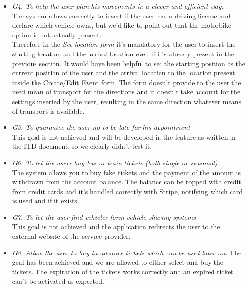 \begin{itemize}
\item \textit{G4. To help the user plan his movements in a clever and efficient way.}\\
The system allows correctly to insert if the user has a driving license and declare which vehicle owns, but we'd like to point out that the motorbike option is not actually present. \\
Therefore in the \textit{See location form} it's mandatory for the user to insert the starting location and the arrival location even if it's already present in the previous section. It would have been helpful to set the starting position as the current position of the user and the arrival location to the location present inside the Create/Edit Event form. The form doesn't provide to the user the used mean of transport for the directions and it doesn't take account for the settings inserted by the user, resulting in the same direction whatever means of transport is available.

\item \textit{G5. To guarantee the user no to be late for his appointment}\\
This goal is not achieved and will be developed in the feature as written in the ITD document, so we clearly didn't test it.

\item \textit{G6. To let the users buy bus or train tickets (both single or seasonal) }\\
The system allows you to buy fake tickets and the payment of the amount is withdrawn from the account balance.
The balance can be topped with credit from credit cards and it's handled correctly with Stripe, notifying which card is used and if it exists.

\item \textit{G7. To let the user find vehicles form vehicle sharing systems}\\
This goal is not achieved and the application redirects the user to the external website of the service provider.

\item \textit{G8. Allow the user to buy in advance tickets which can be used later on.}
The goal has been achieved and we are allowed to either select and buy the tickets. The expiration of the tickets works correctly and an expired ticket can't be activated as expected.
\end{itemize}
